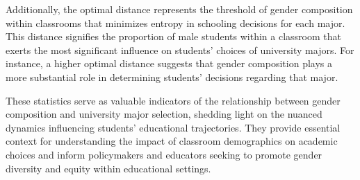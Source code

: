 Additionally, the optimal distance represents the threshold of gender composition within classrooms that minimizes entropy in schooling decisions for each major. This distance signifies the proportion of male students within a classroom that exerts the most significant influence on students' choices of university majors. For instance, a higher optimal distance suggests that gender composition plays a more substantial role in determining students' decisions regarding that major.

These statistics serve as valuable indicators of the relationship between gender composition and university major selection, shedding light on the nuanced dynamics influencing students' educational trajectories. They provide essential context for understanding the impact of classroom demographics on academic choices and inform policymakers and educators seeking to promote gender diversity and equity within educational settings.

